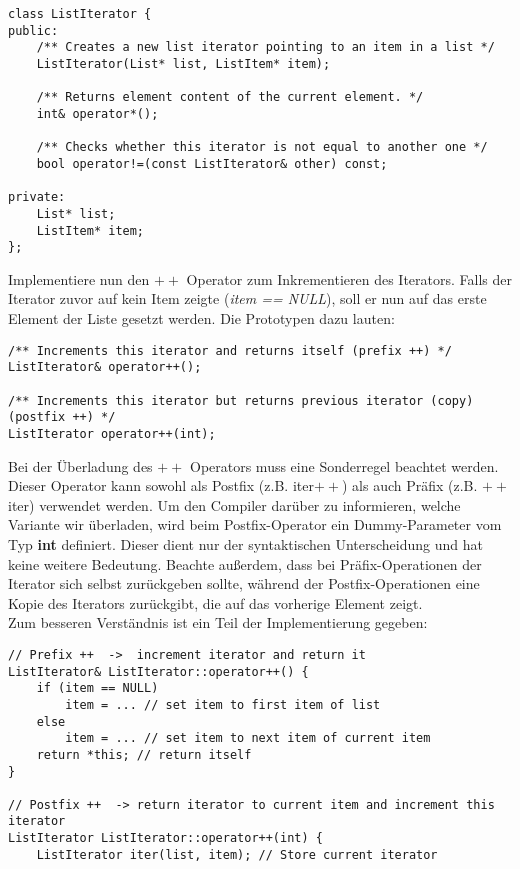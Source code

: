 \documentclass[
  accentcolor=tud1c,	%
  colorbacktitle,		%
  inverttitle,			%
  german,				%
  twoside
]{tudexercise}
\begin{document}
\begin{enumerate}
\begin{lstlisting}
class ListIterator {
public:
	/** Creates a new list iterator pointing to an item in a list */
	ListIterator(List* list, ListItem* item);

	/** Returns element content of the current element. */
	int& operator*();

	/** Checks whether this iterator is not equal to another one */
	bool operator!=(const ListIterator& other) const;

private:
	List* list;
	ListItem* item;
};
\end{lstlisting} 


Implementiere nun den \textbf{$++$} Operator zum Inkrementieren des Iterators.
Falls der Iterator zuvor auf kein Item zeigte (\emph{item == NULL}), soll er nun auf das erste Element der Liste gesetzt werden.
Die Prototypen dazu lauten:
\begin{lstlisting}
/** Increments this iterator and returns itself (prefix ++) */
ListIterator& operator++();
	
/** Increments this iterator but returns previous iterator (copy) (postfix ++) */
ListIterator operator++(int);
\end{lstlisting} 

Bei der Überladung des \textbf{$++$} Operators muss eine Sonderregel beachtet werden.
Dieser Operator kann sowohl als Postfix (z.B. iter$++$) als auch Präfix (z.B. $++$iter) verwendet werden.
Um den Compiler darüber zu informieren, welche Variante wir überladen, wird beim Postfix-Operator ein Dummy-Parameter vom Typ \textbf{int} definiert.
Dieser dient nur der syntaktischen Unterscheidung und hat keine weitere Bedeutung.
Beachte außerdem, dass bei Präfix-Operationen der Iterator sich selbst zurückgeben sollte, während der Postfix-Operationen eine Kopie des Iterators zurückgibt, die auf das vorherige Element zeigt. \\

Zum besseren Verständnis ist ein Teil der Implementierung gegeben: 

\begin{lstlisting}
// Prefix ++  ->  increment iterator and return it
ListIterator& ListIterator::operator++() {
	if (item == NULL)
		item = ... // set item to first item of list
	else
		item = ... // set item to next item of current item
	return *this; // return itself
}

// Postfix ++  -> return iterator to current item and increment this iterator
ListIterator ListIterator::operator++(int) {
	ListIterator iter(list, item); // Store current iterator 
	

\end{lstlisting}
\end{enumerate}
\end{document}
